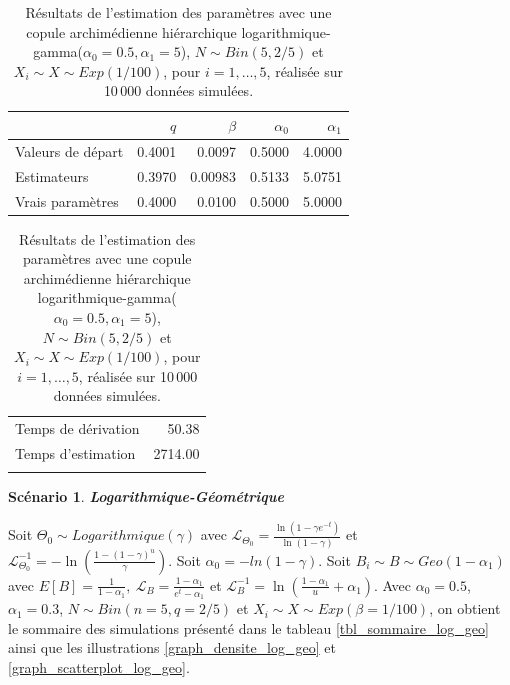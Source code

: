 \documentclass{article}
\newtheorem{Scenario}{Scénario}
\begin{document}
		\begin{table}[H]
			\centering
			\begin{tabular}{lrrrr}
				\hline
				& $q$ & $\beta$ & $\alpha_0$ & $\alpha_1$ \\ 
				\hline
				Valeurs de départ & 0.4001 & 0.0097 & 0.5000 & 4.0000 \\ 
				Estimateurs & 0.3970  &0.00983 & 0.5133 &  5.0751 \\ 
				Vrais paramètres & 0.4000 & 0.0100 & 0.5000 & 5.0000 \\
				\hline
			\end{tabular}
			\begin{tabular}{lr}
				\hline
				&  \\ 
				\hline
				Temps de dérivation & 50.38  \\ 
				Temps d'estimation & 2714.00 \\ 
				\\
				\hline
			\end{tabular}
			\caption[Résultats du scénario \ref{scenario_log_gamma}]{Résultats de l'estimation des paramètres avec une copule archimédienne hiérarchique logarithmique-gamma($\alpha_0=0.5, \alpha_1=5$), $N \sim Bin(5, 2/5)$ et $X_i \sim X \sim Exp(1/100)$, pour $i=1,\dots,5$, réalisée sur 10\,000 données simulées.}
			\label{tbl_resultats_log_gamma}
		\end{table}
	
	
	\begin{Scenario}\label{scenario_log_geo}
		\textbf{Logarithmique-Géométrique}
	\end{Scenario}
	
	Soit $\Theta_0 \sim Logarithmique(\gamma)$ avec $\mathscr{L}_{\Theta_0} = \frac{\ln(1-\gamma e^{-t})}{\ln(1-\gamma)}$ et $\mathscr{L}^{-1}_{\Theta_0} = -\ln \left( \frac{1-(1-\gamma)^u}{\gamma} \right)$. Soit $\alpha_{0} = -ln(1-\gamma)$.
	Soit $B_i \sim B \sim Geo(1-\alpha_1)$ avec $E[B] = \frac{1}{1-\alpha_1},\ \mathscr{L}_{B} = \frac{1-\alpha_1}{e^t-\alpha_1}$ et $\mathscr{L}^{-1}_{B} = \ln\left(\frac{1 - \alpha_1}{u}+\alpha_1\right)$. Avec $\alpha_0 = 0.5$, $\alpha_1 = 0.3$, $N\sim Bin(n=5, q=2/5)$ et $X_i \sim X \sim Exp(\beta = 1/100)$, on obtient le sommaire des simulations présenté dans le tableau \ref{tbl_sommaire_log_geo} ainsi que les illustrations \ref{graph_densite_log_geo} et \ref{graph_scatterplot_log_geo}.
	
\end{document}
